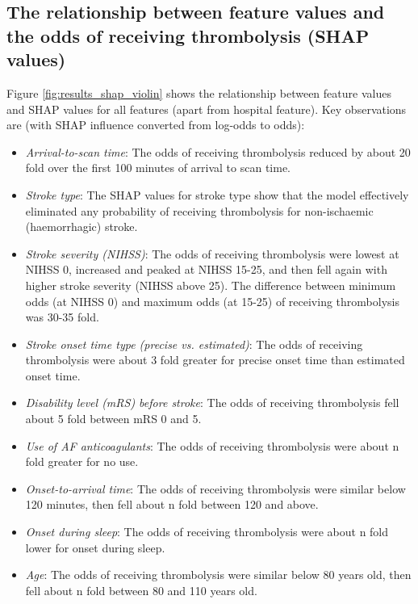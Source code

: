 
\subsection{The relationship between feature values and the odds of receiving thrombolysis (SHAP values)}

Figure \ref{fig:results_shap_violin} shows the relationship between feature values and SHAP values for all features (apart from hospital feature). Key observations are (with SHAP influence converted from log-odds to odds):

\begin{itemize}
    \item \emph{Arrival-to-scan time}: The odds of receiving thrombolysis reduced by about 20 fold over the first 100 minutes of arrival to scan time.
    \item \emph{Stroke type}: The SHAP values for stroke type show that the model effectively eliminated any probability of receiving thrombolysis for non-ischaemic (haemorrhagic) stroke.
    \item \emph{Stroke severity (NIHSS)}: The odds of receiving thrombolysis were lowest at NIHSS 0, increased and peaked at NIHSS 15-25, and then fell again with higher stroke severity (NIHSS above 25). The difference between minimum odds (at NIHSS 0) and maximum odds (at 15-25) of receiving thrombolysis was 30-35 fold.
    \item \emph{Stroke onset time type (precise vs. estimated)}: The odds of receiving thrombolysis were about 3 fold greater for precise onset time than estimated onset time.
    \item \emph{Disability level (mRS) before stroke}: The odds of receiving thrombolysis fell about 5 fold between mRS 0 and 5.
    \item \emph{Use of AF anticoagulants}: The odds of receiving thrombolysis were about n fold greater for no use.
    \item \emph{Onset-to-arrival time}: The odds of receiving thrombolysis were similar below 120 minutes, then fell about n fold between 120 and above.
    \item \emph{Onset during sleep}: The odds of receiving thrombolysis were about n fold lower for onset during sleep.
    \item \emph{Age}: The odds of receiving thrombolysis were similar below 80 years old, then fell about n fold between 80 and 110 years old.    
\end{itemize}

